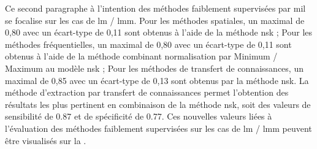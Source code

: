 Ce second paragraphe à l'intention des méthodes faiblement supervisées par \gls{mil} se focalise sur les cas de \gls{lm} / \gls{lmm}. Pour les méthodes spatiales, un \fscore{} maximal de 0,80 avec un écart-type de 0,11 sont obtenus à l'aide de la méthode \gls{nsk} ; Pour les méthodes fréquentielles, un \fscore{} maximal de 0,80 avec un écart-type de 0,11 sont obtenus à l'aide de la méthode combinant normalisation par Minimum / Maximum au modèle \gls{nsk} ; Pour les méthodes de transfert de connaissances, un \fscore{} maximal de 0,85 avec un écart-type de 0,13 sont obtenus par la méthode \gls{nsk}. La méthode d'extraction par transfert de connaissances permet l'obtention des résultats les plus pertinent en combinaison de la méthode \gls{nsk}, soit des valeurs de sensibilité de 0.87 et de spécificité de 0.77. Ces nouvelles valeurs liées à l'évaluation des méthodes faiblement supervisées sur les cas de \gls{lm} / \gls{lmm} peuvent être visualisés sur la .\par

